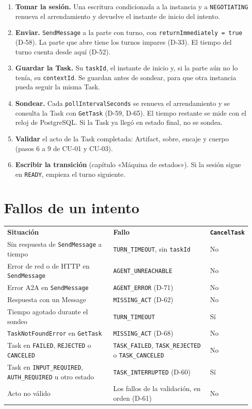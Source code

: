 \begin{enumerate}
  \item \textbf{Tomar la sesión.} Una escritura condicionada a la instancia y a \texttt{NEGOTIATING} renueva el arrendamiento y devuelve el instante de inicio del intento.
  \item \textbf{Enviar.} \texttt{SendMessage} a la parte con turno, con \texttt{returnImmediately = true} (D-58). La parte que abre tiene los turnos impares (D-33). El tiempo del turno cuenta desde aquí (D-52).
  \item \textbf{Guardar la Task.} Su \texttt{taskId}, el instante de inicio y, si la parte aún no lo tenía, su \texttt{contextId}. Se guardan antes de sondear, para que otra instancia pueda seguir la misma Task.
  \item \textbf{Sondear.} Cada \texttt{pollIntervalSeconds} se renueva el arrendamiento y se consulta la Task con \texttt{GetTask} (D-59, D-65). El tiempo restante se mide con el reloj de PostgreSQL. Si la Task ya llegó en estado final, no se sondea.
  \item \textbf{Validar} el acto de la Task completada: Artifact, sobre, encaje y cuerpo (pasos 6 a 9 de CU-01 y CU-03).
  \item \textbf{Escribir la transición} (capítulo «Máquina de estados»). Si la sesión sigue en \texttt{READY}, empieza el turno siguiente.
\end{enumerate}

\section{Fallos de un intento}

\begin{tabular}{p{6.5cm}p{4.5cm}l}
  \textbf{Situación} & \textbf{Fallo} & \textbf{\texttt{CancelTask}} \\
  Sin respuesta de \texttt{SendMessage} a tiempo & \texttt{TURN\_TIMEOUT}, sin \texttt{taskId} & No \\
  Error de red o de HTTP en \texttt{SendMessage} & \texttt{AGENT\_UNREACHABLE} & No \\
  Error A2A en \texttt{SendMessage} & \texttt{AGENT\_ERROR} (D-71) & No \\
  Respuesta con un Message & \texttt{MISSING\_ACT} (D-62) & No \\
  Tiempo agotado durante el sondeo & \texttt{TURN\_TIMEOUT} & Sí \\
  \texttt{TaskNotFoundError} en \texttt{GetTask} & \texttt{MISSING\_ACT} (D-68) & No \\
  Task en \texttt{FAILED}, \texttt{REJECTED} o \texttt{CANCELED} & \texttt{TASK\_FAILED}, \texttt{TASK\_REJECTED} o \texttt{TASK\_CANCELED} & No \\
  Task en \texttt{INPUT\_REQUIRED}, \texttt{AUTH\_REQUIRED} u otro estado & \texttt{TASK\_INTERRUPTED} (D-60) & Sí \\
  Acto no válido & Los fallos de la validación, en orden (D-61) & No \\
\end{tabular}

